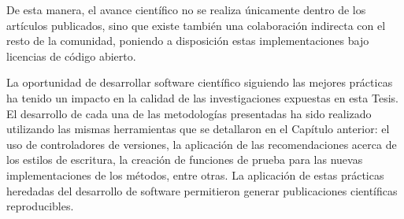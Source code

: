 De esta manera, el avance científico no se realiza únicamente dentro de los
artículos publicados, sino que existe también una colaboración indirecta con el
resto de la comunidad, poniendo a disposición estas implementaciones bajo
licencias de código abierto.

La oportunidad de desarrollar software científico siguiendo las mejores
prácticas ha tenido un impacto en la calidad de las investigaciones
expuestas en esta Tesis.
El desarrollo de cada una de las metodologías presentadas ha sido realizado
utilizando las mismas herramientas que se detallaron en el Capítulo anterior:
el uso de controladores de versiones, la aplicación de las recomendaciones
acerca de los estilos de escritura, la creación de funciones de prueba para las
nuevas implementaciones de los métodos, entre otras.
La aplicación de estas prácticas heredadas del desarrollo de software
permitieron generar publicaciones científicas reproducibles.
